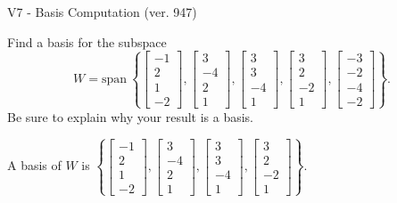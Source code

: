 \begin{exercise}
  \begin{exerciseTitle}V7 - Basis Computation (ver. 947)\end{exerciseTitle}
  \begin{exerciseStatement}
    Find a basis for the subspace 
\[W=\mathrm{span}\ \left\{\left[\begin{array}{r}
-1 \\
2 \\
1 \\
-2
\end{array}\right] , \left[\begin{array}{r}
3 \\
-4 \\
2 \\
1
\end{array}\right] , \left[\begin{array}{r}
3 \\
3 \\
-4 \\
1
\end{array}\right] , \left[\begin{array}{r}
3 \\
2 \\
-2 \\
1
\end{array}\right] , \left[\begin{array}{r}
-3 \\
-2 \\
-4 \\
-2
\end{array}\right]\right\}.\]
 Be sure to explain why your result is a basis.


  \end{exerciseStatement}
  \begin{exerciseAnswer}
   A basis of \(W\) is  \(\left\{\left[\begin{array}{r}
-1 \\
2 \\
1 \\
-2
\end{array}\right] , \left[\begin{array}{r}
3 \\
-4 \\
2 \\
1
\end{array}\right] , \left[\begin{array}{r}
3 \\
3 \\
-4 \\
1
\end{array}\right] , \left[\begin{array}{r}
3 \\
2 \\
-2 \\
1
\end{array}\right]\right\}\).
  


  \end{exerciseAnswer}
\end{exercise}